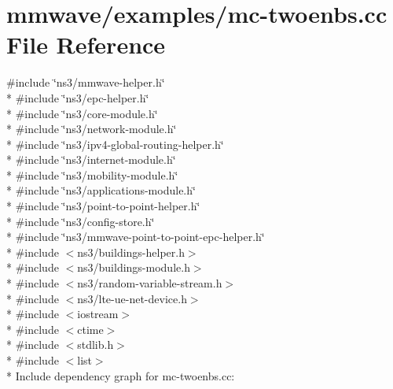 \hypertarget{mc-twoenbs_8cc}{}\section{mmwave/examples/mc-\/twoenbs.cc File Reference}
\label{mc-twoenbs_8cc}
{\ttfamily \#include \char`\"{}ns3/mmwave-\/helper.\+h\char`\"{}}\\*
{\ttfamily \#include \char`\"{}ns3/epc-\/helper.\+h\char`\"{}}\\*
{\ttfamily \#include \char`\"{}ns3/core-\/module.\+h\char`\"{}}\\*
{\ttfamily \#include \char`\"{}ns3/network-\/module.\+h\char`\"{}}\\*
{\ttfamily \#include \char`\"{}ns3/ipv4-\/global-\/routing-\/helper.\+h\char`\"{}}\\*
{\ttfamily \#include \char`\"{}ns3/internet-\/module.\+h\char`\"{}}\\*
{\ttfamily \#include \char`\"{}ns3/mobility-\/module.\+h\char`\"{}}\\*
{\ttfamily \#include \char`\"{}ns3/applications-\/module.\+h\char`\"{}}\\*
{\ttfamily \#include \char`\"{}ns3/point-\/to-\/point-\/helper.\+h\char`\"{}}\\*
{\ttfamily \#include \char`\"{}ns3/config-\/store.\+h\char`\"{}}\\*
{\ttfamily \#include \char`\"{}ns3/mmwave-\/point-\/to-\/point-\/epc-\/helper.\+h\char`\"{}}\\*
{\ttfamily \#include $<$ns3/buildings-\/helper.\+h$>$}\\*
{\ttfamily \#include $<$ns3/buildings-\/module.\+h$>$}\\*
{\ttfamily \#include $<$ns3/random-\/variable-\/stream.\+h$>$}\\*
{\ttfamily \#include $<$ns3/lte-\/ue-\/net-\/device.\+h$>$}\\*
{\ttfamily \#include $<$iostream$>$}\\*
{\ttfamily \#include $<$ctime$>$}\\*
{\ttfamily \#include $<$stdlib.\+h$>$}\\*
{\ttfamily \#include $<$list$>$}\\*
Include dependency graph for mc-\/twoenbs.cc\+:

